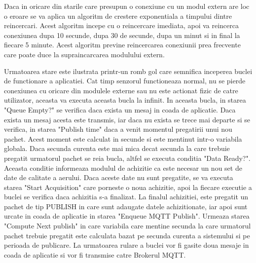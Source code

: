 Daca in oricare din starile care presupun o conexiune cu un modul extern are loc o eroare se va aplica un algoritm de crestere exponentiala a timpului dintre 
reincercari. Acest algoritm incepe cu o reincercare imediata, apoi va reincerca conexiunea dupa 10 secunde, dupa 30 de secunde, dupa un minut si in final la fiecare 
5 minute. Acest algoritm previne reincercarea conexiunii prea frecvente care poate duce la supraincarcarea modulului extern.

Urmatoarea stare este ilustrata printr-un romb gol care semnifica inceperea buclei de functionare a aplicatiei. Cat timp senzorul functioneaza normal, nu se pierde 
conexiunea cu oricare din modulele externe sau nu este actionat fizic de catre utilizator, aceasta va executa aceasta bucla la infinit. In aceasta bucla, in starea 
"Queue Empty?" se verifica daca exista un mesaj in coada de aplicatie. Daca exista un mesaj acesta este transmis, iar daca nu exista se trece mai departe si se verifica, 
in starea "Publish time" daca a venit momentul pregatirii unui nou pachet. Acest moment este calculat in secunde si este mentinut intr-o variabila globala. Daca 
secunda curenta este mai mica decat secunda la care trebuie pregatit urmatorul pachet se reia bucla, altfel se executa conditia "Data Ready?". Aceasta conditie 
informeaza modulul de achizitie ca este necesar un nou set de date de calitate a aerului. Daca aceste date nu sunt pregatite, se va executa starea "Start Acquisition" 
care porneste o noua achizitie, apoi la fiecare executie a buclei se verifica daca achizitia s-a finalizat. La finalul achizitiei, este pregatit un pachet de tip 
PUBLISH in care sunt adaugate datele achizitionate, iar apoi sunt urcate in coada de aplicatie in starea "Enqueue MQTT Publish". Urmeaza starea "Compute Next publish" 
in care variabila care mentine secunda la care urmatorul pachet trebuie pregatit este calculata bazat pe secunda curenta a sistemului si pe perioada de publicare. La 
urmatoarea rulare a buclei vor fi gasite doua mesaje in coada de aplicatie si vor fi transmise catre Brokerul MQTT.
